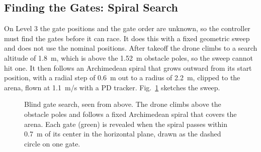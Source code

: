 \documentclass[conference]{IEEEtran}
\begin{document}
\subsection{Finding the Gates: Spiral Search}
\label{sec:search}
On Level 3 the gate positions and the gate order are unknown, so the controller must find the gates before it can race. It does this with a fixed geometric sweep and does not use the nominal positions. After takeoff the drone climbs to a search altitude of 1.8~m, which is above the 1.52~m obstacle poles, so the sweep cannot hit one. It then follows an Archimedean spiral that grows outward from its start position, with a radial step of 0.6~m out to a radius of 2.2~m, clipped to the arena, flown at 1.1~m/s with a PD tracker. Fig.~\ref{fig:spiral} sketches the sweep.

\begin{figure}[t]
\centering
{}
\caption{Blind gate search, seen from above. The drone climbs above the obstacle poles and follows a fixed Archimedean spiral that covers the arena. Each gate (green) is revealed when the spiral passes within 0.7~m of its center in the horizontal plane, drawn as the dashed circle on one gate.}
\label{fig:spiral}
\end{figure}
\end{document}
